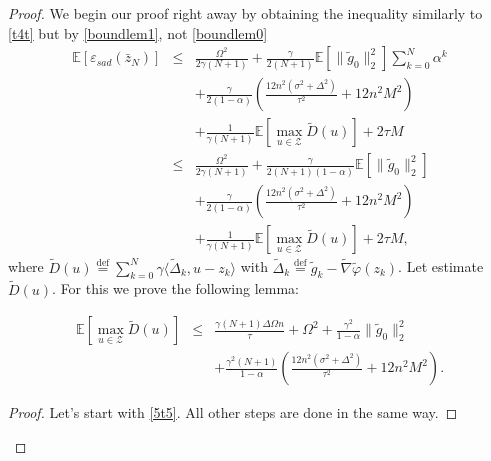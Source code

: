 \documentclass[runningheads]{llncs}
\def\eqdef{\overset{\text{def}}{=}}
\begin{document}
\begin{proof} We begin our proof right away by obtaining the inequality similarly to \eqref{t4t} but by \eqref{boundlem1}, not \eqref{boundlem0}
\begin{eqnarray}
    \label{t4t1}
    \mathbb{E}\left[\varepsilon_{sad}(\bar z_N)\right] 
    &\leq& \frac{\Omega^2}{2\gamma(N+1)} + \frac{\gamma}{2(N+1)} \mathbb{E}\left[\|\tilde g_{0}\|^2_2 \right] \sum\limits_{k=0}^N \alpha^k  \nonumber\\
    && + \frac{\gamma}{2(1 - \alpha)} \left(\frac{12n^2 (\sigma^2 + \Delta^2)}{\tau^2}+ 12n^2M^2\right)  \nonumber\\
    &&+ \frac{1}{\gamma(N+1)}\mathbb{E}\left[\max_{u \in \mathcal{Z}} \tilde D(u)\right]  + 2\tau M  \nonumber\\
    &\leq& \frac{\Omega^2}{2\gamma(N+1)} + \frac{\gamma}{2(N+1)(1 - \alpha)} \mathbb{E}\left[\|\tilde g_{0}\|^2_2 \right] \nonumber\\
    && + \frac{\gamma}{2(1 - \alpha)} \left(\frac{12n^2 (\sigma^2 + \Delta^2)}{\tau^2}+ 12n^2M^2\right)  \nonumber\\
    &&+ \frac{1}{\gamma(N+1)}\mathbb{E}\left[\max_{u \in \mathcal{Z}} \tilde D(u)\right]  + 2\tau M, 
\end{eqnarray}
where $\tilde D(u) \eqdef \sum^N_{k = 0} \gamma \langle \tilde \Delta_k  ,u - z_{k}\rangle$ with $\tilde \Delta_k \eqdef \tilde g_k -  \tilde\nabla \tilde{\varphi}(z_k)$. Let estimate $\tilde D(u)$. For this we prove the following lemma:
\begin{lemma}
\begin{eqnarray}
    \label{191}
    \mathbb{E}\left[\max_{u \in \mathcal{Z}} \tilde D(u)\right] &\leq& \frac{\gamma(N+1)\Delta \Omega n}{\tau} + \Omega^2 + \frac{\gamma^2}{1 - \alpha} \|\tilde g_{0}\|^2_2 \nonumber\\
    &&+ \frac{\gamma^2 (N+1)}{1 - \alpha} \left(\frac{12n^2 (\sigma^2 + \Delta^2)}{\tau^2}+ 12n^2M^2\right). 
\end{eqnarray}
\end{lemma}
\begin{proof}
Let's start with \eqref{5t5}. All other steps are done in the same way.


\end{proof}
\end{proof}
\end{document}
